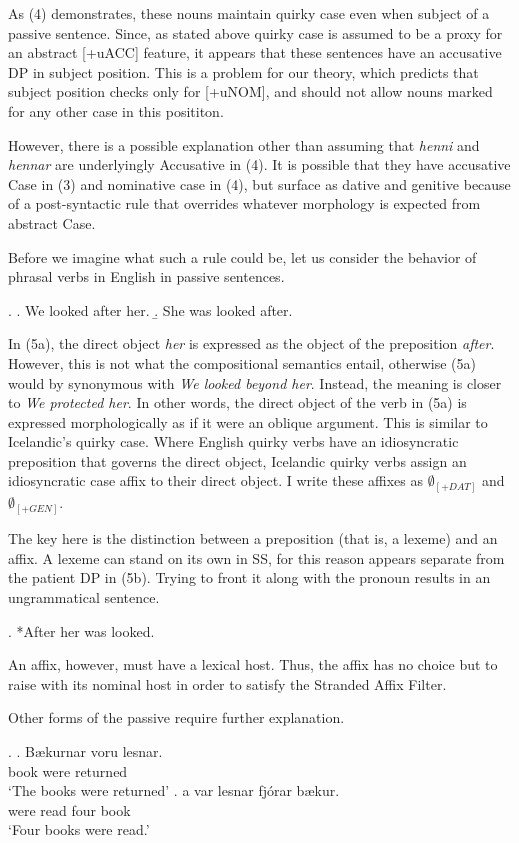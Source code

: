 \documentclass[a4paper, 11pt]{article}
\begin{document}
\begin{enumerate}[label=\textbf{\arabic*.}]
	As (4) demonstrates, these nouns maintain quirky case even when subject of a passive sentence. Since, as stated above
	quirky case is assumed to be a proxy for an abstract [+uACC] feature, it appears that these sentences have an accusative
	DP in subject position. This is a problem for our theory, which predicts that subject position checks only for [+uNOM],
	and should not allow nouns marked for any other case in this posititon.

	
	However, there is a possible explanation other than assuming that \emph{henni} and \emph{hennar} are underlyingly
	Accusative in (4). It is possible that they have accusative Case in (3) and nominative case in (4), but surface as dative and genitive because
	of a post-syntactic rule that overrides whatever morphology is expected from abstract Case.
	
	Before we imagine what such a rule could be, let us consider the behavior of phrasal verbs in English in passive sentences.

	\ex.
	\a.
	  We looked after her.
	\b.
	  She was looked after.
	
	In (5a), the direct object \emph{her} is expressed as the object of the preposition \emph{after}. However, this is not
	what the compositional semantics entail, otherwise (5a) would by synonymous with \emph{We looked beyond her}. Instead, the
	meaning is closer to \emph{We protected her}. In other words, the direct object of the verb in (5a) is expressed morphologically
	as if it were an oblique argument. This is similar to Icelandic's quirky case. Where English quirky verbs have an idiosyncratic
	preposition that governs the direct object, Icelandic quirky verbs assign an idiosyncratic case affix to their direct object.
	I write these affixes as $\emptyset_{[+DAT]}$ and $\emptyset_{[+GEN]}$.

	The key here is the distinction between a preposition (that is, a lexeme) and an affix. A lexeme can stand on its own in SS,
	for this reason appears separate from the patient DP in (5b). Trying to front it along with the pronoun results in an ungrammatical
	sentence.

	\ex. *After her was looked.

	An affix, however, must have a lexical host. Thus, the affix has no choice but to raise with its nominal host in order to
	satisfy the Stranded Affix Filter.

	Other forms of the passive require further explanation.

	\ex.
	\ag.
		B\ae kurnar voru lesnar.\\
		book were returned\\
		\trans `The books were returned'
	\bg.
		\textthorn a var lesnar fjórar b\ae kur.\\
		  were read four book\\
		\trans `Four books were read.'


\end{enumerate}
\end{document}
